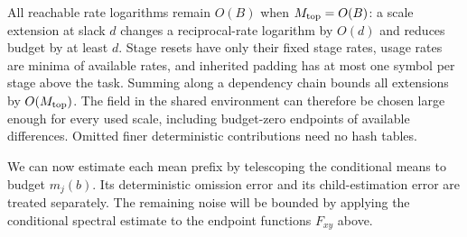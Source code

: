 All reachable rate logarithms remain $O(B)$ when $M_{\rm top}=O(B)$:
a scale extension at slack $d$ changes a reciprocal-rate logarithm by
$O(d)$ and reduces budget by at least $d$.  Stage resets have only their
fixed stage rates, usage rates are minima of available rates, and inherited
padding has at most one symbol per stage above the task.  Summing along a
dependency chain bounds all extensions by $O(M_{\rm top})$.  The field in
the shared environment can therefore be chosen large enough for every
used scale, including budget-zero endpoints of available differences.
Omitted finer deterministic contributions need no hash tables.


We can now estimate each mean prefix by telescoping the conditional
means to budget $m_j(b)$.  Its deterministic omission error and its
child-estimation error are treated separately.  The remaining noise
will be bounded by applying the conditional spectral estimate to the
endpoint functions $F_{xy}$ above.

